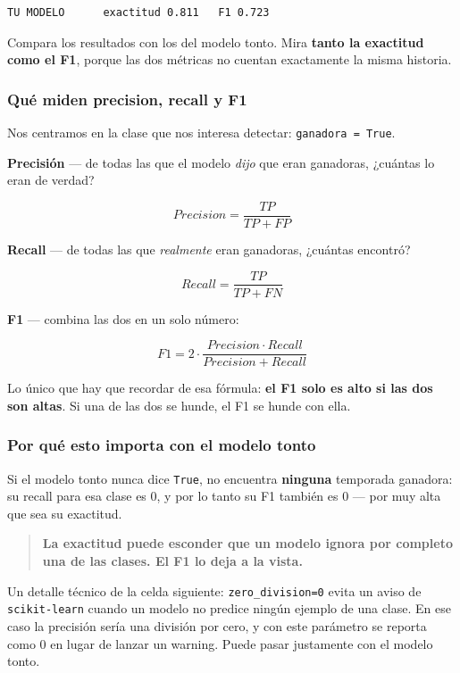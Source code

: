 \documentclass[
]{article}
\begin{document}
\begin{verbatim}
TU MODELO      exactitud 0.811   F1 0.723
\end{verbatim}

\protect{}\label{740f66c3}
Compara los resultados con los del modelo tonto. Mira \textbf{tanto la
exactitud como el F1}, porque las dos métricas no cuentan exactamente la
misma historia.

\subsubsection{Qué miden precision, recall y
F1}\label{quuxe9-miden-precision-recall-y-f1}

Nos centramos en la clase que nos interesa detectar:
\texttt{ganadora\ =\ True}.

\textbf{Precisión} --- de todas las que el modelo \emph{dijo} que eran
ganadoras, ¿cuántas lo eran de verdad?

\[Precision = \frac{TP}{TP + FP}\]

\textbf{Recall} --- de todas las que \emph{realmente} eran ganadoras,
¿cuántas encontró?

\[Recall = \frac{TP}{TP + FN}\]

\textbf{F1} --- combina las dos en un solo número:

\[F1 = 2 \cdot \frac{Precision \cdot Recall}{Precision + Recall}\]

Lo único que hay que recordar de esa fórmula: \textbf{el F1 solo es alto
si las dos son altas}. Si una de las dos se hunde, el F1 se hunde con
ella.

\subsubsection{Por qué esto importa con el modelo
tonto}\label{por-quuxe9-esto-importa-con-el-modelo-tonto}

Si el modelo tonto nunca dice \texttt{True}, no encuentra
\textbf{ninguna} temporada ganadora: su recall para esa clase es 0, y
por lo tanto su F1 también es 0 --- por muy alta que sea su exactitud.

\begin{quote}
\textbf{La exactitud puede esconder que un modelo ignora por completo
una de las clases. El F1 lo deja a la vista.}
\end{quote}

Un detalle técnico de la celda siguiente: \texttt{zero\_division=0}
evita un aviso de \texttt{scikit-learn} cuando un modelo no predice
ningún ejemplo de una clase. En ese caso la precisión sería una división
por cero, y con este parámetro se reporta como 0 en lugar de lanzar un
warning. Puede pasar justamente con el modelo tonto.
\end{document}
